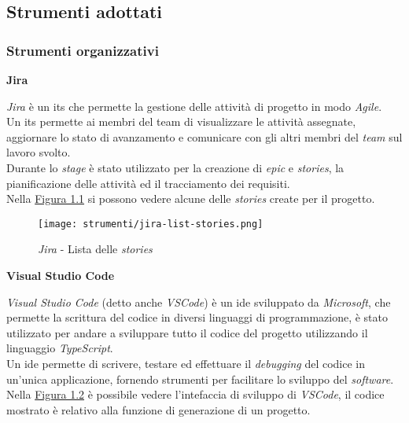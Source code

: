 \pagebreak
\subsection{Strumenti adottati}
\label{sez:strumenti-adottati}

\subsubsection{Strumenti organizzativi}
\label{sez:strumenti-organizzativi}

\noindent \textbf{Jira\\}

\noindent \textit{Jira} è un \gls{its} che permette la gestione delle attività di progetto in modo \textit{Agile}.\\
Un \gls{its} permette ai membri del team di visualizzare le attività assegnate, aggiornare lo stato di avanzamento e comunicare con gli altri membri del \textit{team} sul lavoro svolto. \\
Durante lo \textit{stage} è stato utilizzato per la creazione di \textit{epic} e \textit{stories}, la pianificazione delle attività ed il tracciamento dei requisiti. \\
Nella {\hyperref[fig:jira-list-stories]{Figura 1.1}} si possono vedere alcune delle \textit{stories} create per il progetto.
\begin{figure}[H]
    \label{fig:jira-list-stories}
    \centering
    \texttt{[image: strumenti/jira-list-stories.png]}
    \caption{\textit{Jira} - Lista delle \textit{stories}}
\end{figure}


\noindent \textbf{Visual Studio Code\\}

\noindent \textit{Visual Studio Code} (detto anche \textit{VSCode}) è un \gls{ide} sviluppato da \textit{Microsoft}, che permette la scrittura del codice in diversi linguaggi di programmazione, è stato utilizzato per andare
a sviluppare tutto il codice del progetto utilizzando il linguaggio \textit{TypeScript}.\\
Un \gls{ide} permette di scrivere, testare ed effettuare il \textit{debugging} del codice in un'unica applicazione, fornendo strumenti per facilitare lo sviluppo del \textit{software}.\\
Nella {\hyperref[fig:vscode]{Figura 1.2}} è possibile vedere l'intefaccia di sviluppo di \textit{VSCode}, il codice mostrato è relativo alla funzione di generazione di un progetto.

